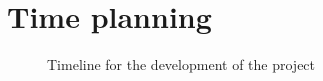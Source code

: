 \section{Time planning}
\label{sec:time-planning}

\begin{figure}
  \centering
  \caption{Timeline for the development of the project}
  \label{fig:project-timeline}
\end{figure}

